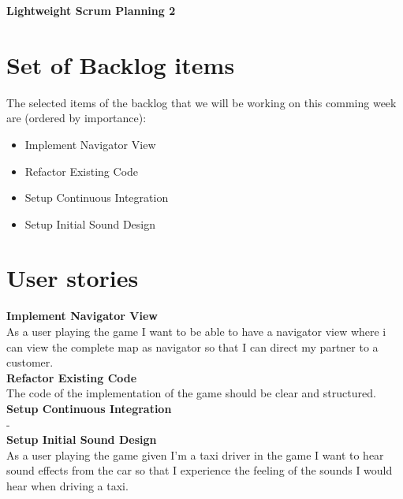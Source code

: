 \documentclass{article}
\begin{document}
\begin{minipage}[H]{\textwidth}
\vspace{0.3cm}
		\begin{center}
		\vspace{0.3cm}
			\Huge{\textbf{Lightweight Scrum Planning 2}}\\
		\vspace{0.3cm}	
		\vspace{0.7cm}		
		\end{center}
	\end{minipage}

\section*{Set of Backlog items}
The selected items of the backlog that we will be working on this comming week  are (ordered by importance):
\begin{itemize}
	\item Implement Navigator View
	\item Refactor Existing Code
	\item Setup Continuous Integration
	\item Setup Initial Sound Design
\end{itemize}

\section*{User stories}
\textbf{Implement Navigator View} \\
As a user playing the game I want to be able to have a navigator view where i can view the complete map as navigator so that I can direct my partner to a customer. \\
\newline
\textbf{Refactor Existing Code} \\
The code of the implementation of the game should be clear and structured. \\
\newline
\textbf{Setup Continuous Integration} \\
- \\
\newline
\textbf{Setup Initial Sound Design} \\
As a user playing the game given I'm a taxi driver in the game I want to hear sound effects from the car so that I experience the feeling of the sounds I would hear when driving a taxi.
\end{document}
